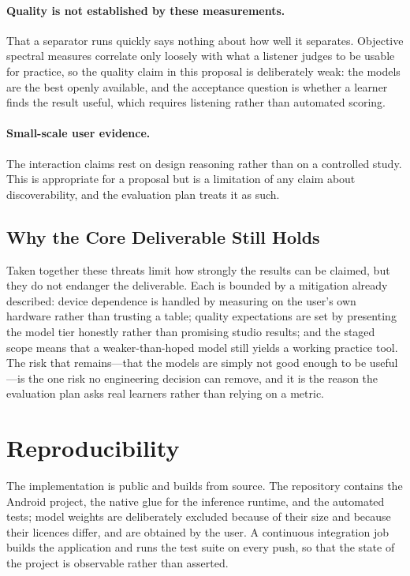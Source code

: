 \documentclass[letterpaper]{article} %
\begin{document}
\paragraph{Quality is not established by these measurements.} That a separator
runs quickly says nothing about how well it separates. Objective spectral
measures correlate only loosely with what a listener judges to be usable for
practice, so the quality claim in this proposal is deliberately weak: the
models are the best openly available, and the acceptance question is whether a
learner finds the result useful, which requires listening rather than
automated scoring.

\paragraph{Small-scale user evidence.} The interaction claims rest on design
reasoning rather than on a controlled study. This is appropriate for a proposal
but is a limitation of any claim about discoverability, and the evaluation plan
treats it as such.

\subsection{Why the Core Deliverable Still Holds}

Taken together these threats limit how strongly the results can be claimed, but
they do not endanger the deliverable. Each is bounded by a mitigation already
described: device dependence is handled by measuring on the user's own hardware
rather than trusting a table; quality expectations are set by presenting the
model tier honestly rather than promising studio results; and the staged scope
means that a weaker-than-hoped model still yields a working practice tool. The
risk that remains---that the models are simply not good enough to be
useful---is the one risk no engineering decision can remove, and it is the
reason the evaluation plan asks real learners rather than relying on a metric.

\section{Reproducibility}

The implementation is public and builds from source. The repository contains the
Android project, the native glue for the inference runtime, and the automated
tests; model weights are deliberately excluded because of their size and
because their licences differ, and are obtained by the user. A continuous
integration job builds the application and runs the test suite on every push,
so that the state of the project is observable rather than asserted.
\end{document}
